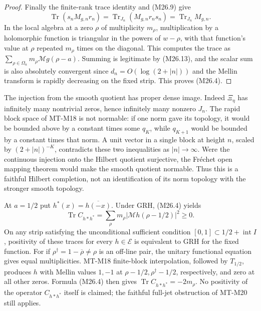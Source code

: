 \begin{proof}
Finally the finite-rank trace identity and (M26.9) give
\[
 \operatorname{Tr}(s_nM_{g,n}r_n)
       =\operatorname{Tr}_{J_n}(M_{g,n}r_ns_n)
       =\operatorname{Tr}_{J_n}M_{g,n}.
\]
In the local algebra at a zero $\rho$ of multiplicity
$m_\rho$, multiplication by a holomorphic function is
triangular in the powers of $w-\rho$, with that function's
value at $\rho$ repeated $m_\rho$ times on the diagonal.
This computes the trace as
$\sum_{\rho\in\Omega_n}m_\rho\mathcal Mg(\rho-a)$.
Summing is legitimate by (M26.13), and the scalar sum
is also absolutely convergent since $d_n=O(\log(2+|n|))$
and the Mellin transform is rapidly decreasing on the
fixed strip. This proves (M26.4).
\end{proof}

The injection from the smooth quotient has proper dense
image. Indeed $\Xi_\eta$ has infinitely many nontrivial
zeros, hence infinitely many nonzero $J_n$. The rapid
block space of MT-M18 is not normable: if one norm gave
its topology, it would be bounded above by a constant
times some $q_K$, while $q_{K+1}$ would be bounded by
a constant times that norm. A unit vector in a single
block at height $n$, scaled by $(2+|n|)^{-K}$, contradicts
these two inequalities as $|n|\to\infty$. Were the
continuous injection onto the Hilbert quotient surjective,
the Fr\'echet open mapping theorem would make the smooth
quotient normable. Thus this is a faithful Hilbert
completion, not an identification of its norm topology
with the stronger smooth topology.

At $a=1/2$ put $h^*(x)=\overline{h(-x)}$. Under GRH,
(M26.4) yields
\[
 \operatorname{Tr}C_{h*h^*}
      =\sum_\rho m_\rho|\mathcal Mh(\rho-1/2)|^2\ge0.
                                                               \tag{M26.15}
\]
On any strip satisfying the unconditional sufficient
condition $[0,1]\subset1/2+\operatorname{int}I$, positivity
of these traces for every $h\in\mathcal E$ is equivalent
to GRH for the fixed function. For if
$\rho^\dagger=1-\overline\rho\ne\rho$ is an off-line pair,
the unitary functional equation gives equal multiplicities.
MT-M18 finite-block interpolation, followed by $T_{1/2}$,
produces $h$ with Mellin values $1,-1$ at
$\rho-1/2,\rho^\dagger-1/2$, respectively, and zero at
all other zeros. Formula (M26.4) then gives
$\operatorname{Tr}C_{h*h^*}=-2m_\rho$.
No positivity of the operator $C_{h*h^*}$ itself is claimed;
the faithful full-jet obstruction of MT-M20 still applies.

